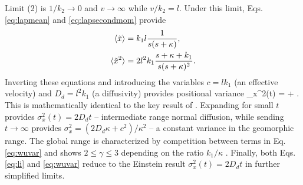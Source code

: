 Limit (2) is $1/k_2 \rightarrow 0$ and $v\rightarrow \infty$ while $v/k_2 = l$. Under this limit, Eqs. \ref{eq:lapmean} and \ref{eq:lapsecondmom} provide
\begin{align}
	\langle \tilde{x} \rangle &= k_1l\frac{1}{s(s+\kappa)},\\
	\langle \tilde{x}^2 \rangle &= 2l^2k_1 \frac{s+\kappa+k_1}{s(s+\kappa)^2}.
\end{align}
Inverting these equations and introducing the variables $c=lk_1$ (an effective velocity) and $D_d = l^2k_1$ (a diffusivity) provides positional variance
\be \sigma_x^2(t) =  + . \label{eq:wuvar}\ee
This is mathematically identical to the key result of \citet{Wu2019}.
Expanding for small $t$ provides $\sigma_x^2(t) = 2D_d t$ -- intermediate range normal diffusion, while sending $t\rightarrow \infty$ provides $\sigma_x^2 = (2D_d\kappa + c^2)/\kappa^2$ -- a constant variance in the geomorphic range.
The global range is characterized by competition between terms in Eq. \ref{eq:wuvar} and shows $2 \leq \gamma \leq 3$ depending on the ratio $k_1/\kappa$ \citep[cf.][]{Wu2019}.
Finally, both Eqs. \ref{eq:li} and \ref{eq:wuvar} reduce to the Einstein result $\sigma_x^2(t) = 2D_d t$ in further simplified limits.
